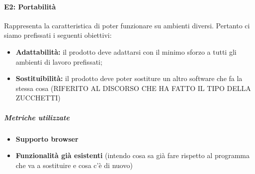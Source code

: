 \paragraph{\textbf{E2: Portabilità}}
Rappresenta la caratteristica di poter funzionare su ambienti diversi. Pertanto ci siamo prefissati i seguenti obiettivi:
\begin{itemize}
	\item \textbf{Adattabilità:} il prodotto deve adattarsi con il minimo sforzo a tutti gli ambienti di lavoro prefissati;
	\item \textbf{Sostituibilità:} il prodotto deve poter sostiture un altro software che fa la stessa cosa (RIFERITO AL DISCORSO CHE HA FATTO IL TIPO DELLA ZUCCHETTI)
\end{itemize}
\subparagraph{Metriche utilizzate}
\begin{itemize}
	\item \textbf{Supporto browser}
	\item \textbf{Funzionalità già esistenti} (intendo cosa sa già fare rispetto al programma che va a sostituire e cosa c'è di nuovo)
\end{itemize}
\begin{table}[!htpb]
	\centering
	\renewcommand{\arraystretch}{2} 
	\caption{Metriche utilizzate Portabilità}
\end{table}
